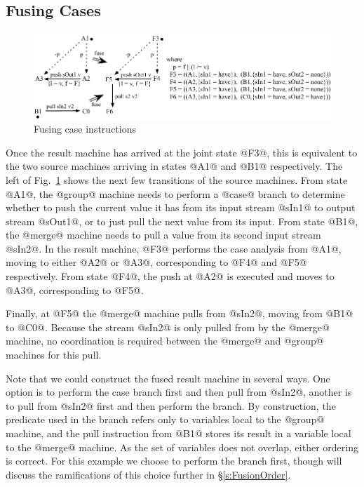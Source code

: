 \subsection{Fusing Cases}
\begin{figure}
\includegraphics[scale=1.1]{copy/03-body/process/figures/fuse-case-pull.pdf}
\caption{Fusing case instructions}
\label{fig:Fusion:Case}
\end{figure}

Once the result machine has arrived at the joint state @F3@, this is equivalent to the two source machines arriving in states @A1@ and @B1@ respectively. The left of Fig.~\ref{fig:Fusion:Case} shows the next few transitions of the source machines. From state @A1@, the @group@ machine needs to perform a @case@ branch to determine whether to push the current value it has from its input stream @sIn1@ to output stream @sOut1@, or to just pull the next value from its input. From state @B1@, the @merge@ machine needs to pull a value from its second input stream @sIn2@. In the result machine, @F3@ performs the case analysis from @A1@, moving to either @A2@ or @A3@, corresponding to @F4@ and @F5@ respectively. From state @F4@, the push at @A2@ is executed and moves to @A3@, corresponding to @F5@.

Finally, at @F5@ the @merge@ machine pulls from @sIn2@, moving from @B1@ to @C0@.
Because the stream @sIn2@ is only pulled from by the @merge@ machine, no coordination is required between the @merge@ and @group@ machines for this pull.

Note that we could construct the fused result machine in several ways. One option is to perform the case branch first and then pull from @sIn2@, another is to pull from @sIn2@ first and then perform the branch. By construction, the predicate used in the branch refers only to variables local to the @group@ machine, and the pull instruction from @B1@ stores its result in a variable local to the @merge@ machine. As the set of variables does not overlap, either ordering is correct. For this example we choose to perform the branch first, though will discuss the ramifications of this choice further in \S\ref{s:FusionOrder}. 


